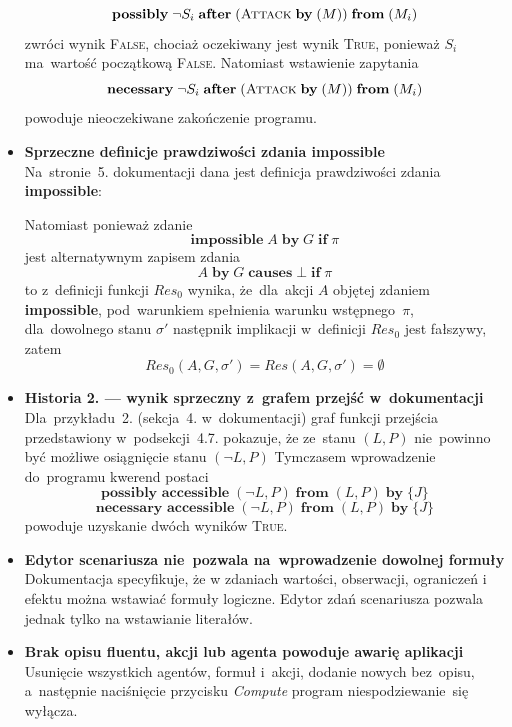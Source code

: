 \documentclass[11pt,a4paper]{article}
\begin{document}
\begin{itemize}
    $$ \textbf{possibly} \; \neg S_i \; \textbf{after} \; (\textsc{Attack} \; \textbf{by} \; (M)) \; \textbf{from} \; (M_i) $$
    zwróci wynik \textsc{False}, chociaż oczekiwany jest wynik \textsc{True}, ponieważ $S_i$ ma~wartość początkową \textsc{False}.
    Natomiast wstawienie zapytania
    $$ \textbf{necessary} \; \neg S_i \; \textbf{after} \; (\textsc{Attack} \; \textbf{by} \; (M)) \; \textbf{from} \; (M_i) $$
    powoduje nieoczekiwane zakończenie programu.
    \item \textbf{Sprzeczne definicje prawdziwości zdania impossible} \\
    Na~stronie~5. dokumentacji dana jest definicja prawdziwości zdania \textbf{impossible}:


    Natomiast ponieważ zdanie
    $$\textbf{impossible} \; A \; \textbf{by} \; G \; \textbf{if} \; \pi$$
    jest alternatywnym zapisem zdania
    $$A \; \textbf{by} \; G \; \textbf{causes} \; \bot \; \textbf{if} \; \pi$$
    to z~definicji funkcji ${Res}_0$ wynika, że~dla~akcji $A$ objętej zdaniem \textbf{impossible}, pod~warunkiem spełnienia warunku wstępnego~$\pi$, dla~dowolnego stanu $\sigma'$ następnik implikacji w~definicji ${Res}_0$ jest fałszywy, zatem
    $${Res}_0(A,G,\sigma') = Res(A,G,\sigma') = \emptyset$$
    \item \textbf{Historia 2. --- wynik sprzeczny z~grafem przejść w~dokumentacji} \\
    Dla~przykładu~2. (sekcja~4. w~dokumentacji) graf funkcji przejścia przedstawiony w~podsekcji~4.7. pokazuje, że ze~stanu $(L, P)$ nie~powinno być możliwe osiągnięcie stanu $(\neg L, P)$ Tymczasem wprowadzenie do~programu kwerend postaci
    $$ \textbf{possibly accessible} \; (\neg L, P) \; \textbf{from} \; (L, P) \; \textbf{by} \; \{ J \} $$
    $$ \textbf{necessary accessible} \; (\neg L, P) \; \textbf{from} \; (L, P) \; \textbf{by} \; \{ J \} $$
    powoduje uzyskanie dwóch wyników \textsc{True}.
    \item \textbf{Edytor scenariusza nie~pozwala na~wprowadzenie dowolnej formuły} \\
    Dokumentacja specyfikuje, że w zdaniach wartości, obserwacji, ograniczeń i efektu można wstawiać formuły logiczne.
    Edytor zdań scenariusza pozwala jednak tylko na wstawianie literałów.
    \item \textbf{Brak opisu fluentu, akcji lub agenta powoduje awarię aplikacji} \\
    Usunięcie wszystkich agentów, formuł i~akcji, dodanie nowych bez~opisu, a~następnie naciśnięcie przycisku \emph{Compute} program niespodziewanie~się wyłącza.
\end{itemize}
\end{document}
